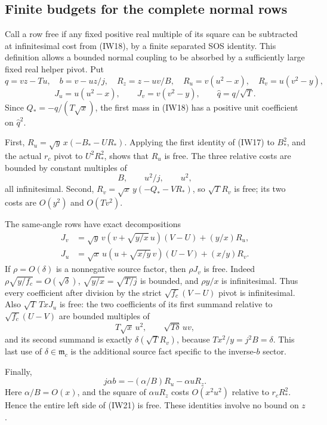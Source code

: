 \subsection{Finite budgets for the complete normal rows}

Call a row free if any fixed positive real multiple of its square can
be subtracted at infinitesimal cost from (IW18), by a finite separated
SOS identity. This definition allows a bounded normal coupling to be
absorbed by a sufficiently large fixed real helper pivot.
Put
\[
 q=vz-Tu,\quad b=v-uz/j,\quad R_z=z-uv/B,\quad
 R_u=v(u^2-x),\quad R_v=u(v^2-y),
\]
\[
 J_u=u(u^2-x),\qquad J_v=v(v^2-y),\qquad
 \widehat q=q/\sqrt T.
\]
Since $Q_*=-q/(T\sqrt x)$, the first mass in (IW18) has a positive
unit coefficient on $\widehat q^2$.

First, $R_u=\sqrt y\,x(-B_*-UR_*)$. Applying the first identity
of (IW17) to $B_*^2$, and the actual $r_c$ pivot to $U^2R_*^2$,
shows that $R_u$ is free. The three relative costs are bounded by
constant multiples of
\[
                         B,\qquad u^2/j,\qquad u^2,
                                                               \tag{IW19}
\]
all infinitesimal. Second,
$R_v=\sqrt x\,y(-Q_*-VR_*)$, so $\sqrt T R_v$ is free;
its two costs are $O(y^2)$ and $O(Tv^2)$.

The same-angle rows have exact decompositions
\[
\begin{split}
 J_v&=\sqrt y\,v(v+\sqrt{y/x}\,u)(V-U)+(y/x)R_u,\\
 J_u&=\sqrt x\,u(u+\sqrt{x/y}\,v)(U-V)+(x/y)R_v.
\end{split}                                                     \tag{IW20}
\]
If $\rho=O(\delta)$ is a nonnegative source factor, then
$\rho J_v$ is free. Indeed $\rho\sqrt{y/f_c}=O(\sqrt\delta)$,
$\sqrt{y/x}=\sqrt{T/j}$ is bounded, and
$\rho y/x$ is infinitesimal. Thus every coefficient after division
by the strict $\sqrt{f_c}(V-U)$ pivot is infinitesimal.
Also $\sqrt T\,TxJ_u$ is free: the two coefficients of its
first summand relative to $\sqrt{f_c}(U-V)$ are bounded multiples of
\[
                  T\sqrt x\,u^2,\qquad\sqrt{T\delta}\,uv,
\]
and its second summand is exactly
$\delta(\sqrt T R_v)$, because $Tx^2/y=j^2B=\delta$.
This last use of $\delta\in\mathfrak m_c$ is the additional
source fact specific to the inverse-$b$ sector.

Finally,
\[
 j\alpha b=-(\alpha/B)R_u-\alpha uR_z.                \tag{IW21}
\]
Here $\alpha/B=O(x)$, and the square of $\alpha uR_z$ costs
$O(x^2u^2)$ relative to $r_cR_*^2$. Hence the entire left side
of (IW21) is free. These identities involve no bound on $z$.

